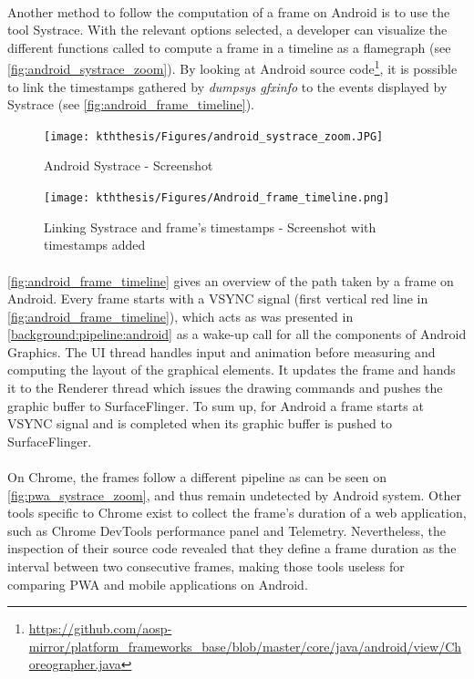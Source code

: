 \documentclass{kththesis}
\begin{document}
    \paragraph{}
    Another method to follow the computation of a frame on Android is to use the tool Systrace. With the relevant options selected, a developer can visualize the different functions called to compute a frame in a timeline as a flamegraph (see \autoref{fig:android_systrace_zoom}). \newline
    By looking at Android source code\footnote{\url{https://github.com/aosp-mirror/platform_frameworks_base/blob/master/core/java/android/view/Choreographer.java}}, it is possible to link the timestamps gathered by \textit{dumpsys gfxinfo} to the events displayed by Systrace (see \autoref{fig:android_frame_timeline}). 
    
    \begin{figure}
        \centering
        \texttt{[image: kththesis/Figures/android\_systrace\_zoom.JPG]}
        \caption{Android Systrace - Screenshot}
        \label{fig:android_systrace_zoom}
    \end{figure}
    
    \begin{figure}[!ht]
        \centering
        \texttt{[image: kththesis/Figures/Android\_frame\_timeline.png]}
        \caption{Linking Systrace and frame's timestamps - Screenshot with timestamps added}
        \label{fig:android_frame_timeline}
    \end{figure}

    \paragraph{}
    \autoref{fig:android_frame_timeline} gives an overview of the path taken by a frame on Android. Every frame starts with a VSYNC signal (first vertical red line in \autoref{fig:android_frame_timeline}), which acts as was presented in \autoref{background:pipeline:android} as a wake-up call for all the components of Android Graphics. The UI thread handles input and animation before measuring and computing the layout of the graphical elements. It updates the frame and hands it to the Renderer thread which issues the drawing commands and pushes the graphic buffer to SurfaceFlinger. To sum up, for Android a frame starts at VSYNC signal and is completed when its graphic buffer is pushed to SurfaceFlinger.
    
    \paragraph{}
    On Chrome, the frames follow a different pipeline as can be seen on \autoref{fig:pwa_systrace_zoom}, and thus remain undetected by Android system. Other tools specific to Chrome exist to collect the frame's duration of a web application, such as Chrome DevTools performance panel and Telemetry. Nevertheless, the inspection of their source code revealed that they define a frame duration as the interval between two consecutive frames, making those tools useless for comparing PWA and mobile applications on Android.
    
\end{document}
